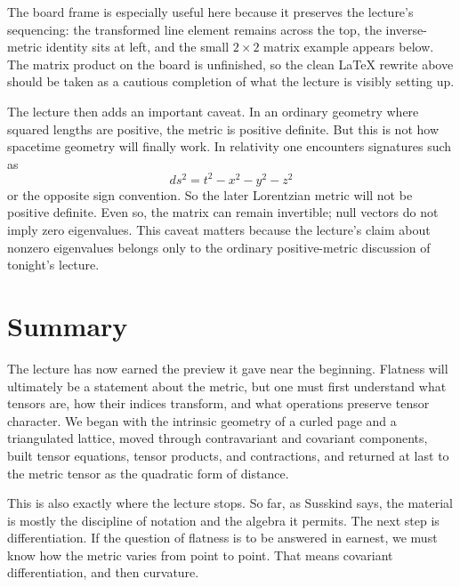 The board frame is especially useful here because it preserves the lecture's sequencing: the transformed line element remains across the top, the inverse-metric identity sits at left, and the small \(2\times 2\) matrix example appears below. The matrix product on the board is unfinished, so the clean LaTeX rewrite above should be taken as a cautious completion of what the lecture is visibly setting up.

The lecture then adds an important caveat. In an ordinary geometry where squared lengths are positive, the metric is positive definite. But this is not how spacetime geometry will finally work. In relativity one encounters signatures such as
\begin{equation}
ds^2=t^2-x^2-y^2-z^2
\end{equation}
or the opposite sign convention. So the later Lorentzian metric will not be positive definite. Even so, the matrix can remain invertible; null vectors do not imply zero eigenvalues. This caveat matters because the lecture's claim about nonzero eigenvalues belongs only to the ordinary positive-metric discussion of tonight's lecture.

\section{Summary}

The lecture has now earned the preview it gave near the beginning. Flatness will ultimately be a statement about the metric, but one must first understand what tensors are, how their indices transform, and what operations preserve tensor character. We began with the intrinsic geometry of a curled page and a triangulated lattice, moved through contravariant and covariant components, built tensor equations, tensor products, and contractions, and returned at last to the metric tensor as the quadratic form of distance.

This is also exactly where the lecture stops. So far, as Susskind says, the material is mostly the discipline of notation and the algebra it permits. The next step is differentiation. If the question of flatness is to be answered in earnest, we must know how the metric varies from point to point. That means covariant differentiation, and then curvature.
